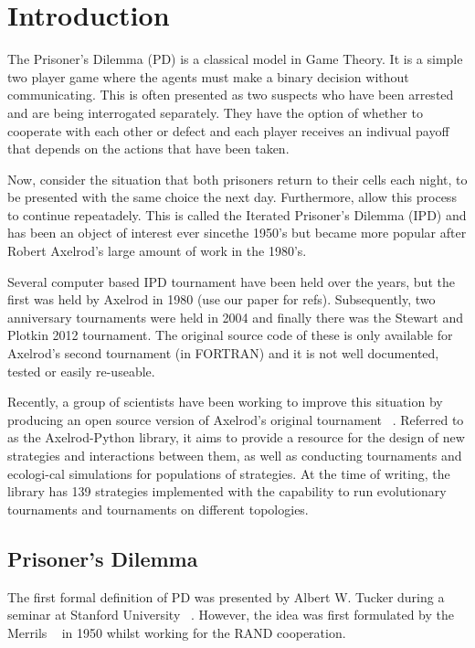 
\chapter{Introduction}\label{cha:introduction}

The Prisoner's Dilemma (PD) is a classical model in Game Theory.
It is a simple two player game where the agents must make a binary decision without communicating.
This is often presented as two suspects who have been arrested and are being interrogated separately.
They have the option of whether to cooperate with each other or defect and each player receives an indivual payoff that depends on the actions that have been taken.

Now, consider the situation that both prisoners return to their cells each night, to be presented with the same choice the next day.
Furthermore, allow this process to continue repeatadely. 
This is called the Iterated Prisoner's Dilemma (IPD) and has been an object of interest ever sincethe 1950's but became more popular after Robert Axelrod's large amount of work in the 1980's.

Several computer based IPD tournament have been held over the years, but the first was held by Axelrod in 1980 (use our paper for refs).
Subsequently, two anniversary tournaments were held in 2004 and finally there was the Stewart and Plotkin 2012 tournament.
The original source code of these is only available for Axelrod's second tournament (in FORTRAN) and it is not well documented, tested or easily re-useable.

Recently, a group of scientists have been working to improve this situation by producing an open source version of Axelrod's original tournament ~\cite{Knight2016}.
Referred to as the Axelrod-Python library, it aims to provide a resource for the design of new strategies and interactions between them, as well as conducting tournaments and ecologi-cal simulations for populations of strategies.
At the time of writing, the library has 139 strategies implemented with the capability to run evolutionary tournaments and tournaments on different topologies.

\section{Prisoner's Dilemma}
The first formal definition of PD was presented by Albert W. Tucker during a seminar at Stanford University ~\cite{Gass2005}.
However, the idea was first formulated by the Merrils ~\cite{Flood1958} in 1950 whilst working for the RAND cooperation.


